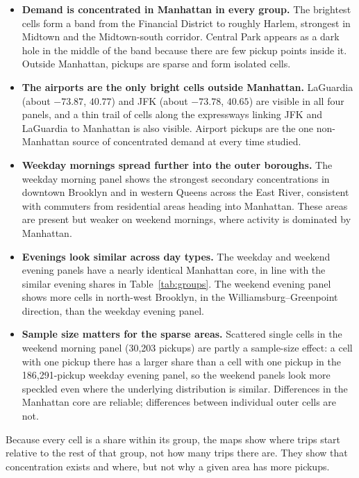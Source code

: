 \documentclass[11pt,a4paper]{article}
\begin{document}
\begin{itemize}
    \item \textbf{Demand is concentrated in Manhattan in every group.} The brightest cells form a band from the Financial District to roughly Harlem, strongest in Midtown and the Midtown-south corridor. Central Park appears as a dark hole in the middle of the band because there are few pickup points inside it. Outside Manhattan, pickups are sparse and form isolated cells.
    \item \textbf{The airports are the only bright cells outside Manhattan.} LaGuardia (about $-73.87$, $40.77$) and JFK (about $-73.78$, $40.65$) are visible in all four panels, and a thin trail of cells along the expressways linking JFK and LaGuardia to Manhattan is also visible. Airport pickups are the one non-Manhattan source of concentrated demand at every time studied.
    \item \textbf{Weekday mornings spread further into the outer boroughs.} The weekday morning panel shows the strongest secondary concentrations in downtown Brooklyn and in western Queens across the East River, consistent with commuters from residential areas heading into Manhattan. These areas are present but weaker on weekend mornings, where activity is dominated by Manhattan.
    \item \textbf{Evenings look similar across day types.} The weekday and weekend evening panels have a nearly identical Manhattan core, in line with the similar evening shares in Table~\ref{tab:groups}. The weekend evening panel shows more cells in north-west Brooklyn, in the Williamsburg--Greenpoint direction, than the weekday evening panel.
    \item \textbf{Sample size matters for the sparse areas.} Scattered single cells in the weekend morning panel (30,203 pickups) are partly a sample-size effect: a cell with one pickup there has a larger share than a cell with one pickup in the 186,291-pickup weekday evening panel, so the weekend panels look more speckled even where the underlying distribution is similar. Differences in the Manhattan core are reliable; differences between individual outer cells are not.
\end{itemize}

Because every cell is a share within its group, the maps show where trips start relative to the rest of that group, not how many trips there are. They show that concentration exists and where, but not why a given area has more pickups.

\end{document}
